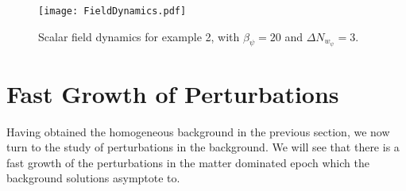 \documentclass[a4paper, amsfonts, amssymb, amsmath, reprint, showkeys, nofootinbib, twoside, superscriptaddress]{revtex4-1}
\begin{document}
\begin{figure}[h!]
  \texttt{[image: FieldDynamics.pdf]}
\caption{Scalar field dynamics for example 2, with $\beta_\psi = 20$ and $\Delta N_{w_\psi} = 3$.}
\label{fig:FieldDynamics}
\end{figure}

\section{Fast Growth of Perturbations}
\label{sec:Perturbations}

Having obtained the homogeneous background in the previous section, we now turn to the study of perturbations in the background. We will see that there is a fast growth of the perturbations in the matter dominated epoch which the background solutions asymptote to.
\end{document}
